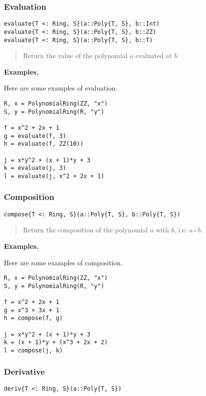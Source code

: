 \documentclass[a4paper,10pt]{article}
\newcommand{\desc}[1]{\vspace{-3mm}\begin{quote}#1\end{quote}}
\begin{document}
{{{\subsubsection{Evaluation}

\begin{lstlisting}
evaluate{T <: Ring, S}(a::Poly{T, S}, b::Int)
evaluate{T <: Ring, S}(a::Poly{T, S}, b::ZZ)
evaluate{T <: Ring, S}(a::Poly{T, S}, b::T)
\end{lstlisting}

\desc{Return the value of the polynomial $a$ evaluated at $b$.}

\textbf{Examples.}

Here are some examples of evaluation.

\begin{lstlisting}
R, x = PolynomialRing(ZZ, "x")
S, y = PolynomialRing(R, "y")

f = x^2 + 2x + 1
g = evaluate(f, 3)
h = evaluate(f, ZZ(10))

j = x*y^2 + (x + 1)*y + 3
k = evaluate(j, 3)
l = evaluate(j, x^2 + 2x + 1)
\end{lstlisting}

\subsubsection{Composition}

\begin{lstlisting}
compose{T <: Ring, S}(a::Poly{T, S}, b::Poly{T, S})
\end{lstlisting}

\desc{Return the composition of the polynomial $a$ with $b$, i.e. $a \circ b$.}

\textbf{Examples.}

Here are some examples of composition.

\begin{lstlisting}
R, x = PolynomialRing(ZZ, "x")
S, y = PolynomialRing(R, "y")

f = x^2 + 2x + 1
g = x^3 + 3x + 1
h = compose(f, g)

j = x*y^2 + (x + 1)*y + 3
k = (x + 1)*y + (x^3 + 2x + 2)
l = compose(j, k)
\end{lstlisting}

\subsubsection{Derivative}

\begin{lstlisting}
deriv{T <: Ring, S}(a::Poly{T, S})
\end{lstlisting}

}}}
\end{document}
